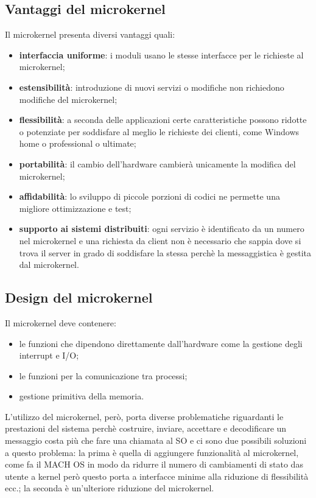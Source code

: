 \documentclass[12pt, letterpaper]{report}
\begin{document}
	\subsection{Vantaggi del microkernel}
	Il microkernel presenta diversi vantaggi quali:
	\begin{itemize}
		\item \textbf{interfaccia uniforme}: i moduli usano le stesse interfacce per le richieste al microkernel;
		\item \textbf{estensibilità}: introduzione di nuovi servizi o modifiche non richiedono modifiche del microkernel;
		\item \textbf{flessibilità}: a seconda delle applicazioni certe caratteristiche possono ridotte o potenziate per soddisfare al meglio le richieste dei clienti, come Windows home o professional o ultimate;
		\item \textbf{portabilità}: il cambio dell'hardware cambierà unicamente la modifica del microkernel;
		\item \textbf{affidabilità}: lo sviluppo di piccole porzioni di codici ne permette una migliore ottimizzazione e test;
		\item \textbf{supporto ai sistemi distribuiti}: ogni servizio è identificato da un numero nel microkernel e una richiesta da client non è necessario che sappia dove si trova il server in grado di soddisfare la stessa perchè la messaggistica è gestita dal microkernel.
	\end{itemize}
	\subsection{Design del microkernel}
	Il microkernel deve contenere:
	\begin{itemize}
		\item le funzioni che dipendono direttamente dall'hardware come la gestione degli interrupt e I/O;
		\item le funzioni per la comunicazione tra processi;
		\item gestione primitiva della memoria.
	\end{itemize}
	L'utilizzo del microkernel, però, porta diverse problematiche riguardanti le prestazioni del sistema perchè costruire, inviare, accettare e decodificare un messaggio costa più che fare una chiamata al SO e ci sono due possibili soluzioni a questo problema: la prima è quella di aggiungere funzionalità al microkernel, come fa il MACH OS in modo da ridurre il numero di cambiamenti di stato das utente a kernel però questo porta a interfacce minime alla riduzione di flessibilità ecc.; la seconda è un'ulteriore riduzione del microkernel.
\end{document}
